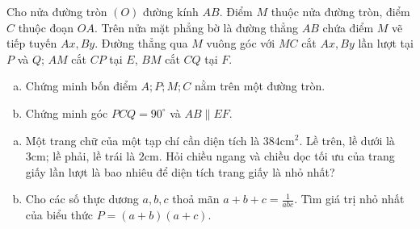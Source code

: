 \begin{ex} %
	Cho nửa đường tròn $(O)$ đường kính $AB$. Điểm $M$ thuộc nửa đường tròn, điểm $C$ thuộc đoạn $OA$. Trên nửa mặt phẳng bờ là đường thẳng $AB$ chứa điểm $M$ vẽ tiếp tuyến $Ax, By$. Đường thẳng qua $M$ vuông góc với $MC$ cắt $Ax, By$ lần lượt tại $P$ và $Q$; $AM$ cắt $CP$ tại $E$, $BM$ cắt $CQ$ tại $F$.
	\begin{enumerate}[a)]
		\item Chứng minh bốn điểm $A; P; M; C$ nằm trên một đường tròn.
		\item Chứng minh góc $PCQ = 90^\circ$ và $AB \parallel EF$.
	\end{enumerate}
	\loigiai{}
\end{ex}

\begin{ex} %
	\begin{enumerate}[a)]
		\item Một trang chữ của một tạp chí cần diện tích là $384\text{cm}^2$. Lề trên, lề dưới là $3\text{cm}$; lề phải, lề trái là $2\text{cm}$. Hỏi chiều ngang và chiều dọc tối ưu của trang giấy lần lượt là bao nhiêu để diện tích trang giấy là nhỏ nhất?
		\item Cho các số thực dương $a, b, c$ thoả mãn $a+b+c = \frac{1}{abc}$.
		Tìm giá trị nhỏ nhất của biểu thức $P = (a+b)(a+c)$.
	\end{enumerate}
	\loigiai{}
\end{ex}

